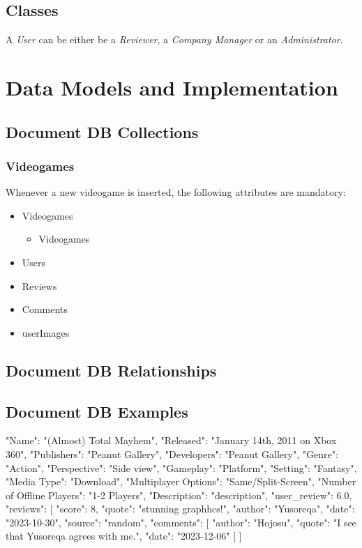 \subsection{Classes}
A \emph{User} can be either be a \emph{Reviewer}, a \emph{Company Manager} or an \emph{Administrator}. 
\section{Data Models and Implementation}
\subsection{Document DB Collections}
\subsubsection{Videogames}
Whenever a new videogame is inserted, the following attributes are mandatory:
\begin{itemize}
	\item Videogames 
            \begin{itemize}
	       \item Videogames 
            \end{itemize}
	\item Users
	\item Reviews 
	\item Comments 
	\item userImages 
\end{itemize}
\subsection{Document DB Relationships}
\subsection{Document DB Examples}
\begin{python}
    {
	"Name": "(Almost) Total Mayhem",
	"Released": "January 14th, 2011 on Xbox 360",
	"Publishers": "Peanut Gallery",
	"Developers": "Peanut Gallery",
	"Genre": "Action",
	"Perspective": "Side view",
	"Gameplay": "Platform",
	"Setting": "Fantasy",
	"Media Type": "Download",
	"Multiplayer Options": "Same/Split-Screen",
	"Number of Offline Players": "1-2 Players",
	"Description": "description",
	"user_review": 6.0,
	"reviews": [
	{
		"score": 8,
		"quote": "stunning graphhcs!",
		"author": "Yusoreqa",
		"date": "2023-10-30",
		"source": "random",
		"comments": [
		{
			"author": "Hojosu",
			"quote": "I see that Yusoreqa agrees with me.",
			"date": "2023-12-06"
		}
		]
	}
	]
}
\end{python}
